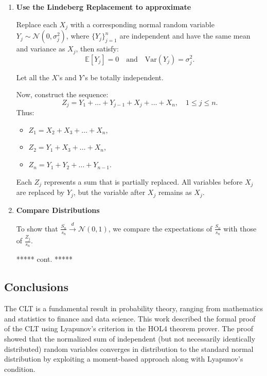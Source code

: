 \begin{itemize}
\begin{enumerate}
\item \textbf{Use the Lindeberg Replacement to approximate}

Replace each \( X_j \) with a corresponding normal random variable \( Y_j \sim \mathcal{N}(0, \sigma_j^2) \), where \( \{Y_j\}_{j=1}^n \) are independent and have the same mean and variance as \( X_j \), then satisfy:
\[
\mathbb{E}[Y_j] = 0 \quad \text{and} \quad \text{Var}(Y_j) = \sigma_j^2.
\]

Let all the \( X\)'s and \( Y\)'s be totally independent. 

Now, construct the sequence:
\[
Z_j = Y_1 + \dots + Y_{j-1} + X_j + \dots + X_n, \quad 1 \leq j \leq n.
\]
Thus:
\begin{itemize}
    \item[] \( Z_1 = X_2 + X_3 + \dots + X_n \),
    \item[] \( Z_2 = Y_1 + X_3 + \dots + X_n \),
    \item[] \( Z_n = Y_1 + Y_2 + \dots + Y_{n-1} \).
\end{itemize}

Each \( Z_j \) represents a sum that is partially replaced. All variables before \( X_j \) are replaced by \( Y_j \), but the variable after \( X_j \) remains as \( X_j \).

\item \textbf{Compare Distributions}

To show that \( \frac{S_n}{s_n} \xrightarrow{d} \mathcal{N}(0, 1) \), we compare the expectations of \( \frac{S_n}{s_n} \) with those of \( \frac{Z_j}{s_n} \). 

***** cont. *****

    \end{enumerate}
\end{itemize}




\subsection{Conclusions}
The CLT is a fundamental result in probability theory, ranging from mathematics and statistics to finance and data science. This work described the formal proof of the CLT using Lyapunov's criterion in the HOL4 theorem prover. The proof showed that the normalized sum of independent (but not necessarily identically distributed) random variables converges in distribution to the standard normal distribution by exploiting a moment-based approach along with Lyapunov's condition.


